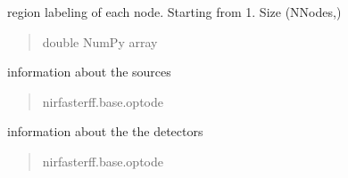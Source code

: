 \documentclass[letterpaper,10pt,english]{sphinxmanual}
\begin{document}
\begin{fulllineitems}

\begin{fulllineitems}
\label{\detokenize{_autosummary/nirfasterff.base.dcs_mesh.dcsmesh:nirfasterff.base.dcs_mesh.dcsmesh.region}}
\pysigstartsignatures
\pysigline
{}
\pysigstopsignatures
\sphinxAtStartPar
region labeling of each node. Starting from 1. Size (NNodes,)
\begin{quote}\begin{description}
\sphinxAtStartPar
double NumPy array

\end{description}\end{quote}

\end{fulllineitems}


\begin{fulllineitems}
\label{\detokenize{_autosummary/nirfasterff.base.dcs_mesh.dcsmesh:nirfasterff.base.dcs_mesh.dcsmesh.source}}
\pysigstartsignatures
\pysigline
{}
\pysigstopsignatures
\sphinxAtStartPar
information about the sources
\begin{quote}\begin{description}
\sphinxAtStartPar
nirfasterff.base.optode

\end{description}\end{quote}

\end{fulllineitems}


\begin{fulllineitems}
\label{\detokenize{_autosummary/nirfasterff.base.dcs_mesh.dcsmesh:nirfasterff.base.dcs_mesh.dcsmesh.meas}}
\pysigstartsignatures
\pysigline
{}
\pysigstopsignatures
\sphinxAtStartPar
information about the the detectors
\begin{quote}\begin{description}
\sphinxAtStartPar
nirfasterff.base.optode


\end{description}
\end{quote}
\end{fulllineitems}
\end{fulllineitems}
\end{document}

